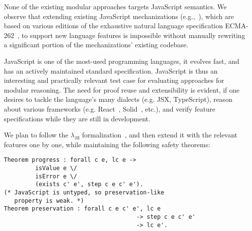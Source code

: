 \documentclass[sigplan,nonacm,review]{acmart}
\begin{document}

None of the existing modular approaches targets JavaScript semantics.
We observe that extending existing JavaScript mechanizations (e.g.,~\cite{guha2010essence,bodin2014trusted}), which are based on various editions of the exhaustive natural language specification ECMA-262~\cite{ECMA},
to support new language features
is impossible without manually rewriting a significant portion of the mechanizations' existing codebase.


JavaScript is one of the most-used programming languages, it evolves fast, and has an actively maintained standard specification. JavaScript is thus an interesting and practically relevant test case for evaluating approaches for modular reasoning. The need for proof reuse and extensibility is evident, if one desires to tackle the language's many dialects (e.g. JSX, TypeScript), reason about various frameworks (e.g. React~\cite{React}, Solid~\cite{Solid}, etc.), and verify feature specifications while they are still in development. 



We plan to follow the $\lambda_{\texttt{JS}}$ formalization~\cite{guha2010essence},
and then extend it with the relevant features one by one,
while maintaining the following safety theorems:

\begin{lstlisting}[numbers=none, language=Coq]
Theorem progress : forall c e, lc e -> 
         isValue e \/ 
         isError e \/ 
         (exists c' e', step c e c' e').
(* JavaScript is untyped, so preservation-like 
   property is weak. *)
Theorem preservation : forall c e c' e', lc e
                                      -> step c e c' e'
                                      -> lc e'.
\end{lstlisting}
\end{document}
